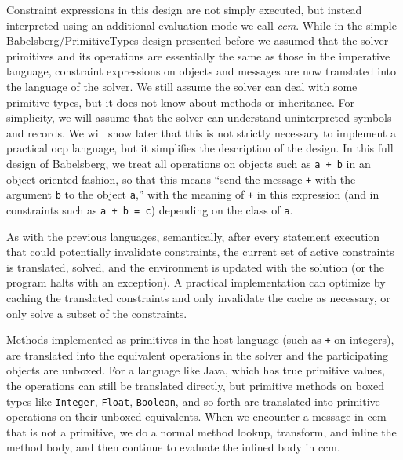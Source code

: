 Constraint expressions in this design are not simply executed, but instead
interpreted using an additional evaluation mode we call \emph{\gls{ccm}}. While
in the simple Babelsberg/PrimitiveTypes design presented before we assumed that
the solver primitives and its operations are essentially the same as those in
the imperative language, constraint expressions on objects and messages are now
translated into the language of the solver. We still assume the solver can deal
with some primitive types, but it does not know about methods or
inheritance. For simplicity, we will assume that the solver can understand
uninterpreted symbols and records. We will show later that this is not strictly
necessary to implement a practical \ac{ocp} language, but it simplifies the
description of the design. In this full design of Babelsberg, we treat all
operations on objects such as \verb|a + b| in an object-oriented fashion, so
that this means ``send the message \verb|+| with the argument \verb|b| to the
object \verb|a|,'' with the meaning of \verb|+| in this expression (and in
constraints such as \verb|a + b = c|) depending on the class of \verb|a|.

\addlines[-2]
As with the previous languages, semantically, after every statement
execution that could potentially invalidate constraints, the current
set of active constraints is translated, solved, and the environment
is updated with the solution (or the program halts with an
exception). A practical implementation can optimize by caching the
translated constraints and only invalidate the cache as necessary, or
only solve a subset of the constraints.



Methods implemented as primitives in the host language (such as
\verb!+! on integers), are translated into the equivalent operations
in the solver and the participating objects are unboxed. For a
language like Java, which has true primitive values, the operations
can still be translated directly, but primitive methods on boxed types
like \lstinline|Integer|, \lstinline|Float|, \lstinline|Boolean|, and
so forth are translated into primitive operations on their unboxed
equivalents. When we encounter a message in \gls{ccm} that is not a
primitive, we do a normal method lookup, transform, and inline the
method body, and then continue to evaluate the inlined body in
\gls{ccm}.

